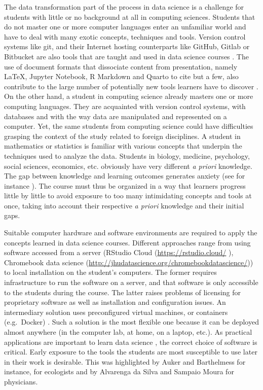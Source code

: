 \documentclass{aims} %
\theoremstyle{definition}
\begin{document}
The data transformation part of the process in data science is a
challenge for students with little or no background at all in computing
sciences. Students that do not master one or more computer languages
enter an unfamiliar world and have to deal with many exotic concepts,
techniques and tools. Version control systems like git, and their
Internet hosting counterparts like GitHub, Gitlab or Bitbucket are also
tools that are taught and used in data science courses
\cite{Fiksel2019, Hsing2019}. The use of document formats that
dissociate content from presentation, namely LaTeX, Jupyter Notebook, R
Markdown and Quarto to cite but a few, also contribute to the large
number of potentially new tools learners have to discover
\cite{Baumer2014}. On the other hand, a student in computing science
already masters one or more computing languages. They are acquainted
with version control systems, with databases and with the way data are
manipulated and represented on a computer. Yet, the same students from
computing science could have difficulties grasping the context of the
study related to foreign disciplines. A student in mathematics or
statistics is familiar with various concepts that underpin the
techniques used to analyze the data. Students in biology, medicine,
psychology, social sciences, economics, etc. obviously have very
different \emph{a priori} knowledge. The gap between knowledge and
learning outcomes generates anxiety (see for instance
\cite{Onwuegbuzie2003}). The course must thus be organized in a way that
learners progress little by little to avoid exposure to too many
intimidating concepts and tools at once, taking into account their
respective \emph{a priori} knowledge and their initial gaps.

Suitable computer hardware and software environments are required to
apply the concepts learned in data science courses. Different approaches
range from using software accessed from a server \cite{Theobold2021}
(RStudio Cloud (\url{https://rstudio.cloud/} \cite{Rstudio2015}),
Chromebook data science
(\url{http://jhudatascience.org/chromebookdatascience/})) to local
installation on the student's computers. The former requires
infrastructure to run the software on a server, and that software is
only accessible to the students during the course. The latter raises
problems of licensing for proprietary software as well as installation
and configuration issues. An intermediary solution uses preconfigured
virtual machines, or containers (e.g.~Docker)
\cite{Cetinkaya-Rundel2018, Boettiger2015}. Such a solution is the most
flexible one because it can be deployed almost anywhere (in the computer
lab, at home, on a laptop, etc.). As practical applications are
important to learn data science \cite{Larwin2011}, the correct choice of
software is critical. Early exposure to the tools the students are most
susceptible to use later in their work is desirable. This was
highlighted by Auker and Barthelmess \cite{Auker2020} for instance, for
ecologists and by Alvarenga da Silva and Sampaio Moura
\cite{Alvarenga2020} for physicians.
\end{document}
